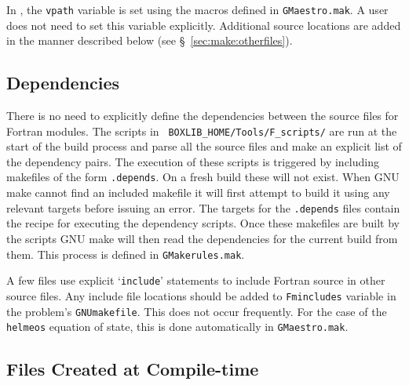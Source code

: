 In \maestro, the {\tt vpath} variable is set using the macros defined
in {\tt GMaestro.mak}.  A user does not need to set this variable
explicitly.  Additional source locations are added in the manner
described below (see \S~\ref{sec:make:otherfiles}).

\subsection{Dependencies}

There is no need to explicitly define the dependencies between the
source files for Fortran modules.  The scripts in {\tt
BOXLIB\_HOME/Tools/F\_scripts/} are run at the start of the build
process and parse all the source files and make an explicit list of
the dependency pairs.  The execution of these scripts is triggered
by including makefiles of the form {\tt *.depends}.  On a fresh build these
will not exist.  When GNU make cannot find an included makefile it will
first attempt to build it using any relevant targets before issuing an 
error.  The targets for the {\tt *.depends} files contain the recipe for
executing the dependency scripts.  Once these makefiles are built by the
scripts GNU make will then read the dependencies for the current build
from them.  This process is defined in {\tt GMakerules.mak}.

A few files use explicit `{\tt include}' statements to include Fortran
source in other source files.  Any include file locations should be
added to {\tt Fmincludes} variable in the problem's {\tt GNUmakefile}.
This does not occur frequently.  For the case of the {\tt helmeos}
equation of state, this is done automatically in {\tt GMaestro.mak}.


\subsection{Files Created at Compile-time}

